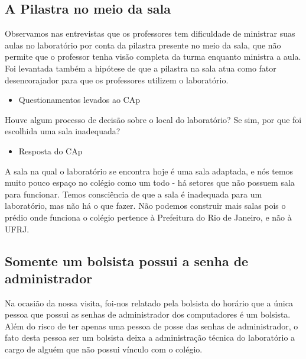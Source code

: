 \subsection{A Pilastra no meio da sala}\label{sec:LABEL_CHP_REL_SEC_PROBS_SUBSEC_PIL}

Observamos nas entrevistas que os professores tem dificuldade de ministrar suas aulas no laboratório por conta da pilastra presente no meio da sala, que não permite que o professor tenha visão completa da turma enquanto ministra a aula. Foi levantada também a hipótese de que a pilastra na sala atua como fator desencorajador para que os professores utilizem o laboratório.

\begin{itemize}
    \item Questionamentos levados ao CAp
\end{itemize}

Houve algum processo de decisão sobre o local do laboratório? Se sim, por que foi escolhida uma sala inadequada?

\begin{itemize}
    \item Resposta do CAp
\end{itemize}

A sala na qual o laboratório se encontra hoje é uma sala adaptada, e nós temos muito pouco espaço no colégio como um todo - há setores que não possuem sala para funcionar. Temos consciência de que a sala é inadequada para um laboratório, mas não há o que fazer. Não podemos construir mais salas pois o prédio onde funciona o colégio pertence à Prefeitura do Rio de Janeiro, e não à UFRJ.

\subsection{Somente um bolsista possui a senha de administrador}\label{sec:LABEL_CHP_REL_SEC_PROBS_SUBSEC_PSWD}

Na ocasião da nossa visita, foi-nos relatado pela bolsista do horário que a única pessoa que possui as senhas de administrador dos computadores é um bolsista. Além do risco de ter apenas uma pessoa de posse das senhas de administrador, o fato desta pessoa ser um bolsista deixa a administração técnica do laboratório a cargo de alguém que não possui vínculo com o colégio.

